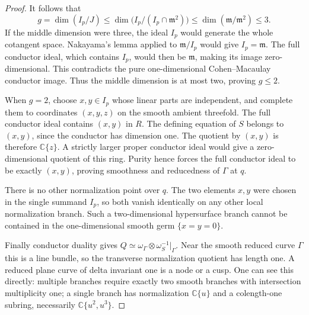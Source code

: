 \begin{proof}
It follows that
\[
 g=\dim(I_p/J)
 \le \dim\bigl(I_p/(I_p\cap\mathfrak m^2)\bigr)
 \le \dim(\mathfrak m/\mathfrak m^2)\le3.
 \tag{C.CR.14}
\]
If the middle dimension were three, the ideal $I_p$
would generate the whole cotangent space. Nakayama's
lemma applied to $\mathfrak m/I_p$ would give
$I_p=\mathfrak m$. The full conductor ideal, which
contains $I_p$, would then be $\mathfrak m$, making its
image zero-dimensional. This contradicts the pure
one-dimensional Cohen--Macaulay conductor image.
Thus the middle dimension is at most two, proving
$g\le2$.

When $g=2$, choose $x,y\in I_p$ whose linear parts
are independent, and complete them to coordinates
$(x,y,z)$ on the smooth ambient threefold. The full
conductor ideal contains $(x,y)$ in $R$. The defining
equation of $S$ belongs to $(x,y)$, since the conductor
has dimension one. The quotient by $(x,y)$ is therefore
$\mathbb C\{z\}$. A strictly larger proper conductor
ideal would give a zero-dimensional quotient of this
ring. Purity hence forces the full conductor ideal
to be exactly $(x,y)$, proving smoothness and
reducedness of $\Gamma$ at $q$.

There is no other normalization point over $q$.
The two elements $x,y$ were chosen in the single
summand $I_p$, so both vanish identically on any other
local normalization branch. Such a two-dimensional
hypersurface branch cannot be contained in the
one-dimensional smooth germ $\{x=y=0\}$.

Finally conductor duality gives
$Q\simeq\omega_\Gamma\otimes\omega_S^{-1}|_\Gamma$.
Near the smooth reduced curve $\Gamma$ this is a
line bundle, so the transverse normalization quotient
has length one. A reduced plane curve of delta
invariant one is a node or a cusp. One can see this
directly: multiple branches require exactly two
smooth branches with intersection multiplicity one;
a single branch has normalization
$\mathbb C\{u\}$ and a colength-one subring, necessarily
$\mathbb C\{u^2,u^3\}$.
\end{proof}

